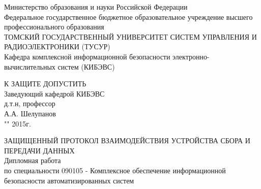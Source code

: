 \newpage
{}

\begin{center}
Министерство образования и науки Российской Федерации\\
Федеральное государственное бюджетное образовательное учреждение высшего профессионального образования\\
ТОМСКИЙ ГОСУДАРСТВЕННЫЙ УНИВЕРСИТЕТ СИСТЕМ УПРАВЛЕНИЯ И РАДИОЭЛЕКТРОНИКИ (ТУСУР)\\
Кафедра комплексной информационной безопасности электронно-вычислительных систем (КИБЭВС)\\
\end{center}

\hfill
\begin{minipage}[right]{0.4\linewidth}
\begin{singlespace}
 К ЗАЩИТЕ ДОПУСТИТЬ \\
 Заведующий кафедрой КИБЭВС \\
 д.т.н, профессор \\
 \underline{\hspace{2.5cm}}А.А. Шелупанов \\
 "\underline{\hspace{1cm}}"\underline{\hspace{3cm}} 2015г.\\
\end{singlespace} 
\end{minipage}


\begin{center}
ЗАЩИЩЕННЫЙ ПРОТОКОЛ ВЗАИМОДЕЙСТВИЯ УСТРОЙСТВА СБОРА И ПЕРЕДАЧИ ДАННЫХ \\
Дипломная работа \\
по специальности 090105 - Комплексное обеспечение информационной безопасности автоматизированных систем \\
\vspace{2cm}
\end{center}



